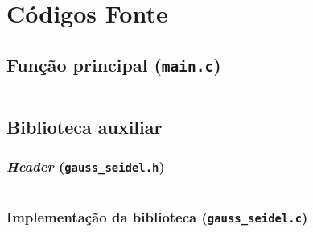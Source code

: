 \section{Códigos Fonte}

	\subsection{Função principal (\texttt{main.c})}
		\inputminted[autogobble,breaklines,linenos,frame=lines,tabsize=4,obeytabs=true,fontsize=\footnotesize
		]{c}{source_codes/main.c}
		\label{lst:main.c}

	\subsection{Biblioteca auxiliar}
		\subsubsection{\emph{Header} (\texttt{gauss\_seidel.h})}
			\inputminted[autogobble,breaklines,linenos,frame=lines,tabsize=4,obeytabs=true,fontsize=\footnotesize
			]{c}{source_codes/gauss_seidel.h}
			\label{lst:gauss_seidel.h}

		\subsubsection{Implementação da biblioteca (\texttt{gauss\_seidel.c})}
			\inputminted[autogobble,breaklines,linenos,frame=lines,tabsize=4,obeytabs=true,fontsize=\footnotesize
			]{c}{source_codes/gauss_seidel.c}
			\label{lst:gauss_seidel.c}